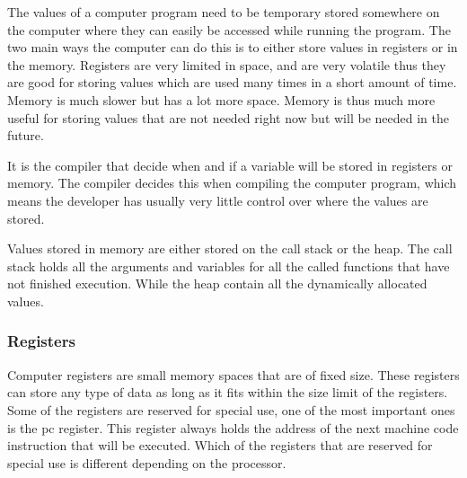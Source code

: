  

The values of a computer program need to be temporary stored somewhere on the computer where they can easily be accessed while running the program.
The two main ways the computer can do this is to either store values in registers or in the memory.
Registers are very limited in space, and are very volatile thus they are good for storing values which are used many times in a short amount of time.
Memory is much slower but has a lot more space.
Memory is thus much more useful for storing values that are not needed right now but will be needed in the future.


It is the compiler that decide when and if a variable will be stored in registers or memory.
The compiler decides this when compiling the computer program, which means the developer has usually very little control over where the values are stored.


Values stored in memory are either stored on the call stack or the heap.
The call stack holds all the arguments and variables for all the called functions that have not finished execution.
While the heap contain all the dynamically allocated values.


\subsubsection{Registers}
Computer registers are small memory spaces that are of fixed size.
These registers can store any type of data as long as it fits within the size limit of the registers.
Some of the registers are reserved for special use, one of the most important ones is the \acrfull{pc} register.
This register always holds the address of the next machine code instruction that will be executed.
Which of the registers that are reserved for special use is different depending on the processor.


